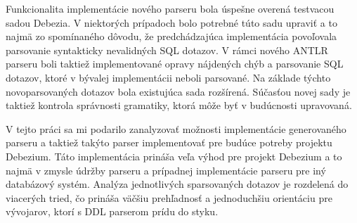Funkcionalita implementácie nového parseru bola úspešne overená testvacou sadou Debezia. V niektorých prípadoch bolo potrebné túto sadu upraviť a to najmä zo spomínaného dôvodu, že predchádzajúca implementácia povoľovala parsovanie syntakticky nevalidných SQL dotazov. V rámci nového ANTLR parseru boli taktiež implementované opravy nájdených chýb a parsovanie SQL dotazov, ktoré v bývalej implementácii neboli parsované. Na základe týchto novoparsovaných dotazov bola existujúca sada rozšírená. Súčasťou novej sady je taktiež kontrola správnosti gramatiky, ktorá môže byť v budúcnosti upravovaná.

V tejto práci sa mi podarilo zanalyzovať možnosti implementácie generovaného parseru a taktiež takýto parser implementovať pre budúce potreby projektu Debezium. Táto implementácia prináša veľa výhod pre projekt Debezium a to najmä v zmysle údržby parseru a prípadnej implementácie parseru pre iný databázový systém. Analýza jednotlivých sparsovaných dotazov je rozdelená do viacerých tried, čo prináša väčšiu prehľadnosť a jednoduchšiu orientáciu pre vývojarov, ktorí s DDL parserom prídu do styku.